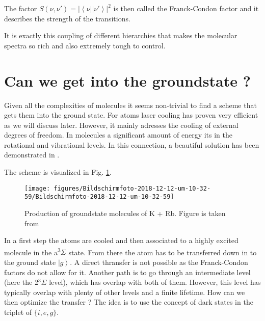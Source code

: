 \documentclass[10pt]{article}
\let\cite\citep
\providecommand\citep{\cite}
\newcommand{\bra}[1]{\ensuremath{\left\langle#1\right|}}
\newcommand{\ket}[1]{\ensuremath{\left|#1\right\rangle}}
\begin{document}
The factor $S(\nu, \nu')=|\bra{\nu}\ket{\nu'}|^2$ is then called the Franck-Condon factor
and it describes the strength of the transitions.

It is exactly this coupling of different hierarchies that makes the molecular spectra so rich and also extremely tough to control.


\section{Can we get into the groundstate ?}

Given all the complexities of molecules it seems non-trivial to find a scheme that gets them into the ground state. For atoms laser cooling has proven very efficient as we will discuss later. However, it mainly adresses the cooling of external degrees of freedom. In molecules a significant amount of energy its in the rotational and vibrational levels. In this connection, a beautiful solution has been demonstrated in \cite{Ni_2008}. 

The scheme is visualized in Fig. \ref{898773}.
\begin{figure}[h!]
\begin{center}
\texttt{[image: figures/Bildschirmfoto-2018-12-12-um-10-32-59/Bildschirmfoto-2018-12-12-um-10-32-59]}
\caption{{Production of groundstate molecules of K + Rb. Figure is taken from
\protect\cite{Ni_2008}
{\label{898773}}%
}}
\end{center}
\end{figure}

In a first step the atoms are cooled and then associated to a highly excited molecule in the a\textsuperscript{3}$\Sigma$ state. From there the atom has to be transferred down in to the ground state $\ket{g}$. A direct thransfer is not possible as the Franck-Condon factors do not allow for it. Another path is to go through an intermediate level (here the 2$^3 \Sigma$ level), which has overlap with both of them. However, this level has typically overlap with plenty of other levels and a finite lifetime. How can we then optimize the transfer ? The idea is to use the concept of dark states in the triplet of $\{i, e, g\}$.
\end{document}
